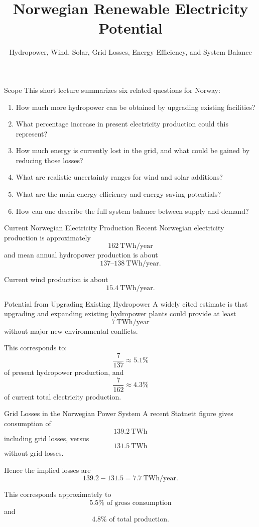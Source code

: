 \documentclass[aspectratio=169]{beamer}
\title{Norwegian Renewable Electricity Potential}
\subtitle{Hydropower, Wind, Solar, Grid Losses, Energy Efficiency, and System Balance}
\author{}
\date{}
\begin{document}
\frame{\titlepage}

\begin{frame}{Scope}
This short lecture summarizes six related questions for Norway:
\begin{enumerate}
    \item How much more hydropower can be obtained by upgrading existing facilities?
    \item What percentage increase in present electricity production could this represent?
    \item How much energy is currently lost in the grid, and what could be gained by reducing those losses?
    \item What are realistic uncertainty ranges for wind and solar additions?
    \item What are the main energy-efficiency and energy-saving potentials?
    \item How can one describe the full system balance between supply and demand?
\end{enumerate}
\end{frame}

\begin{frame}{Current Norwegian Electricity Production}
Recent Norwegian electricity production is approximately
\[
162\ \text{TWh/year}
\]
and mean annual hydropower production is about
\[
137\text{--}138\ \text{TWh/year}.
\]

\medskip

Current wind production is about
\[
15.4\ \text{TWh/year}.
\]
\end{frame}

\begin{frame}{Potential from Upgrading Existing Hydropower}
A widely cited estimate is that upgrading and expanding existing hydropower plants could provide at least
\[
7\ \text{TWh/year}
\]
without major new environmental conflicts.

\medskip

This corresponds to:
\[
\frac{7}{137}\approx 5.1\%
\]
of present hydropower production, and
\[
\frac{7}{162}\approx 4.3\%
\]
of current total electricity production.
\end{frame}

\begin{frame}{Grid Losses in the Norwegian Power System}
A recent Statnett figure gives consumption of
\[
139.2\ \text{TWh}
\]
including grid losses, versus
\[
131.5\ \text{TWh}
\]
without grid losses.

\medskip

Hence the implied losses are
\[
139.2-131.5 = 7.7\ \text{TWh/year}.
\]

This corresponds approximately to
\[
5.5\% \text{ of gross consumption}
\]
and
\[
4.8\% \text{ of total production.}
\]
\end{frame}
\end{document}
